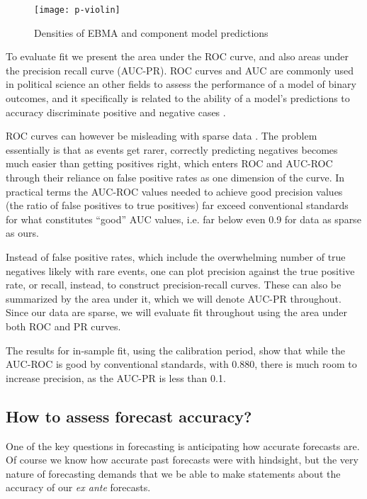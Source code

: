 \documentclass[pdftex,11pt]{article}
\begin{document}
\begin{figure}
\texttt{[image: p-violin]}
\caption{Densities of EBMA and component model predictions}
\label{violin}
\end{figure}

To evaluate fit we present the area under the ROC curve, and also areas under the precision recall curve (AUC-PR). ROC curves and AUC are commonly used in political science an other fields to assess the performance of a model of binary outcomes, and it specifically is related to the ability of a model's predictions to accuracy discriminate positive and negative cases \citep[e.g.][]{cook:2007}. 

ROC curves can however be misleading with sparse data \citep[see][]{davis:goadrich:2006, beger:2015b}. The problem essentially is that as events get rarer, correctly predicting negatives becomes much easier than getting positives right, which enters ROC and AUC-ROC through their reliance on false positive rates as one dimension of the curve. In practical terms the AUC-ROC values needed to achieve good precision values (the ratio of false positives to true positives) far exceed conventional standards for what constitutes ``good'' AUC values, i.e. far below even 0.9 for data as sparse as ours. 

Instead of false positive rates, which include the overwhelming number of true negatives likely with rare events, one can plot precision against the true positive rate, or recall, instead, to construct precision-recall curves. These can also be summarized by the area under it, which we will denote AUC-PR throughout. Since our data are sparse, we will evaluate fit throughout using the area under both ROC and PR curves. 

The results for in-sample fit, using the calibration period, show that while the AUC-ROC is good by conventional standards, with 0.880, there is much room to increase precision, as the AUC-PR is less than 0.1. 

\subsection{How to assess forecast accuracy?}

One of the key questions in forecasting is anticipating how accurate forecasts are. Of course we know how accurate past forecasts were with hindsight, but the very nature of forecasting demands that we be able to make statements about the accuracy of our \textit{ex ante} forecasts. 
\end{document}
